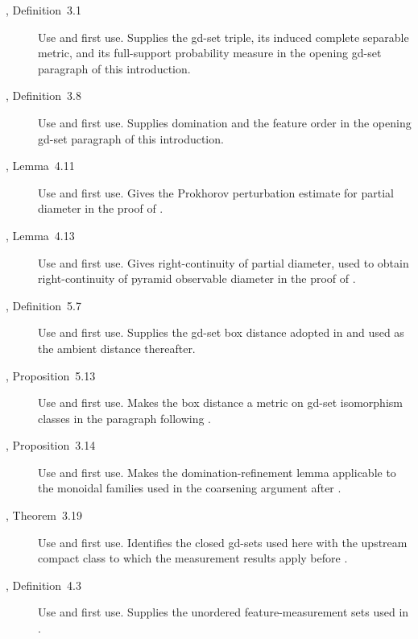 \documentclass{amsart}
\theoremstyle{plain}
\theoremstyle{definition}
\theoremstyle{remark}
\begin{document}
\begingroup\raggedright
\begin{description}
\item[\cite{gds1}, Definition~3.1]
\textup{Use and first use.} Supplies the gd-set triple, its induced complete
separable metric, and its full-support probability measure in the opening
gd-set paragraph of this introduction.

\item[\cite{gds1}, Definition~3.8]
\textup{Use and first use.} Supplies domination and the feature order in the
opening gd-set paragraph of this introduction.

\item[\cite{gds1}, Lemma~4.11]
\textup{Use and first use.} Gives the Prokhorov perturbation estimate for
partial diameter in the proof of
.

\item[\cite{gds1}, Lemma~4.13]
\textup{Use and first use.} Gives right-continuity of partial diameter, used
to obtain right-continuity of pyramid observable diameter in the proof of
.

\item[\cite{gds1}, Definition~5.7]
\textup{Use and first use.} Supplies the gd-set box distance adopted in
 and used as the ambient distance thereafter.

\item[\cite{gds1}, Proposition~5.13]
\textup{Use and first use.} Makes the box distance a metric on gd-set
isomorphism classes in the paragraph following .

\item[\cite{gds2}, Proposition~3.14]
\textup{Use and first use.} Makes the domination-refinement lemma applicable
to the monoidal families used in the coarsening argument after
.

\item[\cite{gds2}, Theorem~3.19]
\textup{Use and first use.} Identifies the closed gd-sets used here with the
upstream compact class to which the measurement results apply before
.

\item[\cite{gds2}, Definition~4.3]
\textup{Use and first use.} Supplies the unordered feature-measurement sets
used in
.


\end{description}
\end{document}

